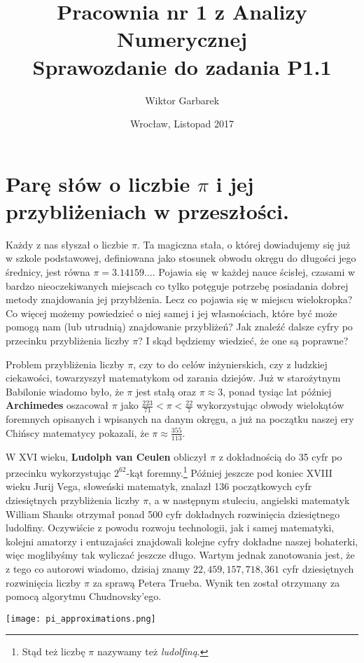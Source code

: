 \documentclass[10pt,wide]{mwart}
\theoremstyle{definition}
\begin{document}
\title{\textbf{Pracownia nr 1 z Analizy Numerycznej}\\
Sprawozdanie do zadania \textbf{P1.1}}
\author{Wiktor Garbarek}
\date{Wrocław, Listopad 2017}

\maketitle
 \thispagestyle{empty}
 \section{Parę słów o liczbie \(\pi\) i jej przybliżeniach w przeszłości.}
 Każdy z nas słyszał o liczbie \(\pi\).
 Ta magiczna stała, o której dowiadujemy się już w szkole podstawowej,
 definiowana jako stosunek obwodu okręgu do długości jego średnicy, jest równa \( \pi = 3.14159... \).
 Pojawia się w każdej nauce ścisłej, czasami w bardzo nieoczekiwanych miejscach co tylko potęguje potrzebę posiadania dobrej metody znajdowania jej przyblżenia.
 Lecz co pojawia się w miejscu wielokropka? Co więcej możemy powiedzieć o niej samej i jej własnościach, które być może pomogą nam (lub utrudnią) znajdowanie przybliżeń? Jak znaleźć dalsze cyfry po przecinku przybliżenia liczby \(\pi\)? I skąd będziemy wiedzieć, że one są poprawne?

 \par Problem przybliżenia liczby \(\pi\), czy to do celów inżynierskich, czy z ludzkiej ciekawości, towarzyszył matematykom od zarania dziejów.
 Już w starożytnym Babilonie wiadomo było, że \(\pi\) jest stałą oraz \(\pi \approx 3 \), ponad tysiąc lat później \textbf{Archimedes} oszacował \(\pi\) jako \(\frac{223}{71} < \pi < \frac{22}{7}\) wykorzystując obwody wielokątów foremnych opisanych i wpisanych na danym okręgu,
a już na początku naszej ery Chińscy matematycy pokazali, że \(\pi \approx \frac{355}{113}\).
 \par W XVI wieku, \textbf{Ludolph van Ceulen} obliczył \(\pi\) z dokładnością do 35 cyfr po przecinku wykorzystując \(2^{62}\)-kąt foremny.\footnote{Stąd też liczbę \(\pi\) nazywamy też \emph{ludolfiną}.}
 Później jeszcze pod koniec XVIII wieku Jurij Vega, słoweński matematyk,
 znalazł 136 początkowych cyfr dziesiętnych przybliżenia liczby \(\pi\), a w następnym stuleciu, angielski matematyk William Shanks otrzymał ponad 500 cyfr dokładnych rozwinięcia dziesiętnego ludolfiny.
 Oczywiście z powodu rozwoju technologii, jak i samej matematyki, kolejni amatorzy i entuzajaści znajdowali kolejne cyfry dokładne naszej bohaterki, więc moglibyśmy tak wyliczać jeszcze długo.
 Wartym jednak zanotowania jest, że z tego co autorowi wiadomo, dzisiaj znamy \(22,459,157,718,361\) cyfr dziesiętnych rozwinięcia liczby \(\pi\) za sprawą Petera Trueba. Wynik ten został otrzymany za pomocą algorytmu Chudnovsky'ego.
 \\\begin{center}
 \texttt{[image: pi\_approximations.png]}
\end{center}
\end{document}
